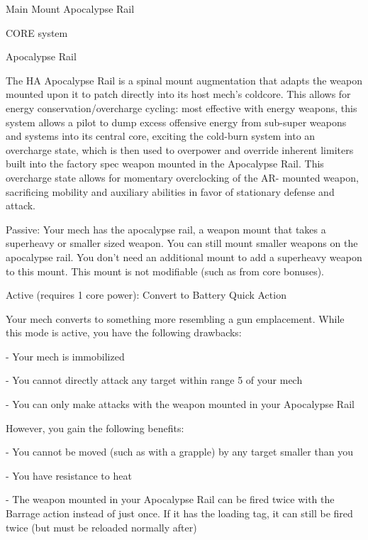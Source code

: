  Main Mount                                          Apocalypse Rail

                                              CORE system




                                                Apocalypse Rail

 The HA Apocalypse Rail is a spinal mount augmentation that adapts the weapon mounted upon it to
 patch directly into its host mech’s coldcore. This allows for energy conservation/overcharge cycling:
 most effective with energy weapons, this system allows a pilot to dump excess offensive energy from
 sub-super weapons and systems into its central core, exciting the cold-burn system into an overcharge
 state, which is then used to overpower and override inherent limiters built into the factory spec weapon
 mounted in the Apocalypse Rail. This overcharge state allows for momentary overclocking of the AR-
 mounted weapon, sacrificing mobility and auxiliary abilities in favor of stationary defense and attack.

 Passive: Your mech has the apocalypse rail, a weapon mount that takes a superheavy or smaller sized
 weapon. You can still mount smaller weapons on the apocalypse rail. You don’t need an additional
 mount to add a superheavy weapon to this mount. This mount is not modifiable (such as from core
 bonuses).


 Active (requires 1 core power): Convert to Battery
 Quick Action

 Your mech converts to something more resembling a gun emplacement. While this mode is active, you
 have the following drawbacks:

      -   Your mech is immobilized

      -   You cannot directly attack any target within range 5 of your mech

      -   You can only make attacks with the weapon mounted in your Apocalypse Rail

 However, you gain the following benefits:

      -   You cannot be moved (such as with a grapple) by any target smaller than you

      -   You have resistance to heat

      -   The weapon mounted in your Apocalypse Rail can be fired twice with the Barrage action
          instead of just once. If it has the loading tag, it can still be fired twice (but must be reloaded
          normally after)

